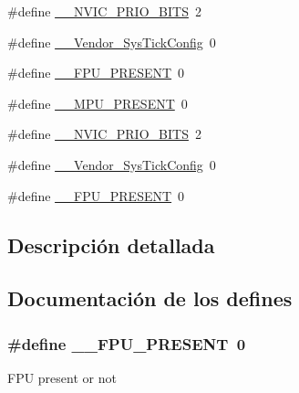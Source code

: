 \begin{DoxyCompactItemize}
\#define \hyperlink{group___c_m_s_i_s__43_x_x___m0___c_o_m_m_o_n_gae3fe3587d5100c787e02102ce3944460}{\+\_\+\+\_\+\+N\+V\+I\+C\+\_\+\+P\+R\+I\+O\+\_\+\+B\+I\+TS}~2
\item 
\#define \hyperlink{group___c_m_s_i_s__43_x_x___m0___c_o_m_m_o_n_gab58771b4ec03f9bdddc84770f7c95c68}{\+\_\+\+\_\+\+Vendor\+\_\+\+Sys\+Tick\+Config}~0
\item 
\#define \hyperlink{group___c_m_s_i_s__43_x_x___m0___c_o_m_m_o_n_gac1ba8a48ca926bddc88be9bfd7d42641}{\+\_\+\+\_\+\+F\+P\+U\+\_\+\+P\+R\+E\+S\+E\+NT}~0
\item 
\#define \hyperlink{group___c_m_s_i_s__43_x_x___m0___c_o_m_m_o_n_ga4127d1b31aaf336fab3d7329d117f448}{\+\_\+\+\_\+\+M\+P\+U\+\_\+\+P\+R\+E\+S\+E\+NT}~0
\item 
\#define \hyperlink{group___c_m_s_i_s__43_x_x___m0___c_o_m_m_o_n_gae3fe3587d5100c787e02102ce3944460}{\+\_\+\+\_\+\+N\+V\+I\+C\+\_\+\+P\+R\+I\+O\+\_\+\+B\+I\+TS}~2
\item 
\#define \hyperlink{group___c_m_s_i_s__43_x_x___m0___c_o_m_m_o_n_gab58771b4ec03f9bdddc84770f7c95c68}{\+\_\+\+\_\+\+Vendor\+\_\+\+Sys\+Tick\+Config}~0
\item 
\#define \hyperlink{group___c_m_s_i_s__43_x_x___m0___c_o_m_m_o_n_gac1ba8a48ca926bddc88be9bfd7d42641}{\+\_\+\+\_\+\+F\+P\+U\+\_\+\+P\+R\+E\+S\+E\+NT}~0
\end{DoxyCompactItemize}


\subsection{Descripción detallada}


\subsection{Documentación de los \textquotesingle{}defines\textquotesingle{}}
\subsubsection[{\texorpdfstring{\+\_\+\+\_\+\+F\+P\+U\+\_\+\+P\+R\+E\+S\+E\+NT}{__FPU_PRESENT}}]{\setlength{\rightskip}{0pt plus 5cm}\#define \+\_\+\+\_\+\+F\+P\+U\+\_\+\+P\+R\+E\+S\+E\+NT~0}\hypertarget{group___c_m_s_i_s__43_x_x___m0___c_o_m_m_o_n_gac1ba8a48ca926bddc88be9bfd7d42641}{}\label{group___c_m_s_i_s__43_x_x___m0___c_o_m_m_o_n_gac1ba8a48ca926bddc88be9bfd7d42641}
F\+PU present or not 

